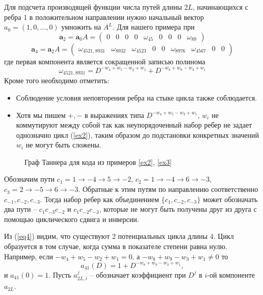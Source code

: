 \documentclass[specification,annotation,times]{itmo-student-thesis}
\newcommand{\inputTikZ}[1]{}
\newcommand{\bs}[1]{\ensuremath{\boldsymbol{#1}}}
\begin{document}
Для подсчета производящей функции числа путей длины $2L$, начинающихся с ребра 1 в положительном направлении
нужно начальный вектор $a_0=(1,0,...,0)$ умножить на $A^L$. Для нашего примера при
 \begin{equation}
\bs a_2=\bs a_0 A =
\begin{pmatrix}
     0    & 0 &    0 &    0 &    \omega_{45}   &  0 &    0 &    0 &    \omega_{89}
 \end{pmatrix}
\end{equation} 
\begin{equation}\label{eq4}
 \bs a_4=\bs a_2A=
 \begin{pmatrix}    
    \omega_{4521,8931}  &\omega_{8932} & \omega_{4523 } &0 &    0 &    \omega_{8976}   & \omega_{4567 }&    0 &    0 
 \end{pmatrix}
\end{equation} 
где первая компонента является сокращенной записью полинома
\[
 \omega_{4521,8931}=D^{-w_4+w_5-w_2+w_1}+D^{-w_8+w_9-w_3+w_1}
\]
Кроме того необходимо отметить:
\begin{itemize}
\item 
Соблюдение условия неповторения ребра на стыке цикла также соблюдается.
\item
Хотя мы пишем $+, -$  в выражениях типа $D^{-w_4+w_5-w_2+w_1}$,
$w_i$ не коммутируют между собой так как неупорядоченный набор ребер не задает однозначно цикл (\ref{ex2}),
 таким образом до подстановки конкретных значений $w_i$ не могут быть сложены.
\end{itemize}

\begin{figure}[!h]
  \centering
  \inputTikZ{ex_graph2}
   \caption{Граф Таннера для кода из примеров \ref{ex2}, \ref{ex3}}
  \label{fig1}
\end{figure}

\begin{example} \label{ex2}
  Обозначим пути $c_1=1 \to -4 \to 5 \to -2$, $c_2=1 \to -4 \to 6 \to -3$, $c_3=2 \to -5 \to 6 \to -3$.
 Обратные к этим путям по направлению соответственно $c_{-1}, c_{-2}, c_{-3}$.
 Тогда набор ребер как объединением $\{c_1,c_{-2},c_{-3}\}$ может обозначать два пути -- $c_1c_{-3}c_{-2}$ и 
$c_1c_{-2}c_{-3}$, которые не могут быть получены друг из друга с помощью циклического сдвига и инверсии.
\end{example}

Из (\ref{eq4}) видим, что существуют 2 потенциальных цикла длины 4. 
Цикл образуется в том случае, когда сумма в показателе степени равна нулю. 
Например, если $-w_4+w_5-w_2+w_1=0$, а  $-w_8+w_9-w_3+w_1\neq 0$  то 
\[
a_{41}(D)=1+D^{-w_8+w_9-w_3+w_1}, 
\]
и $a_{41}(0)=1$.
Пусть $a_{2L,i}^{j}$ -- обозначает коэффициент при $D^j$ в $i$-ой компоненте $a_{2L}$.
\end{document}
